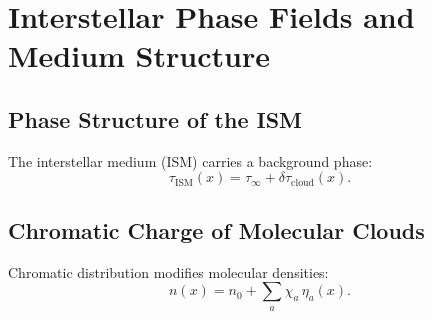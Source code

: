 \chapter{Interstellar Phase Fields and Medium Structure}

\section{Phase Structure of the ISM}
The interstellar medium (ISM) carries a background phase:
\[
\tau_{\mathrm{ISM}}(x) = \tau_\infty + \delta\tau_{\mathrm{cloud}}(x).
\]

\section{Chromatic Charge of Molecular Clouds}
Chromatic distribution modifies molecular densities:
\[
n(x) = n_0 + \sum_a \chi_a\,\eta_a(x).
\]

